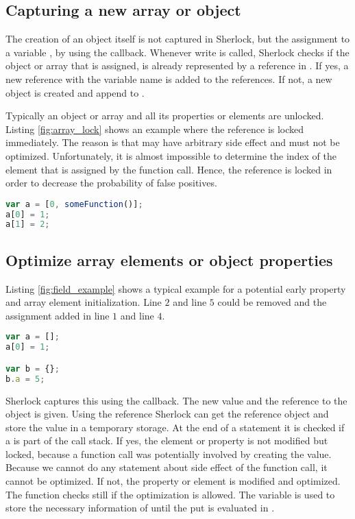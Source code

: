 \subsection{Capturing a new array or object}
The creation of an object itself is not captured in Sherlock, but the assignment to a variable
, by using the  callback. Whenever write is called, Sherlock checks if the object 
or array that is assigned, is already represented by a reference in . If yes, a 
new reference with the variable name is added to the references. If not, a new  
object is created and append to .

Typically an object or array and all its properties or elements are unlocked. Listing 
\ref{fig:array_lock} shows an example where the reference is locked immediately. The reason 
is that  may have arbitrary side effect and must not be optimized. 
Unfortunately, it is almost impossible to determine the index of the element that is assigned
 by the function call. Hence, the reference is locked in order to decrease the probability of
 false positives.

\begin{lstlisting}[caption={Example for an array that is immediately locked after creation. Neither index \js{0} nor index \js{1} is optimized.},language=Javascript,label=fig:array_lock]
var a = [0, someFunction()];
a[0] = 1;
a[1] = 2;
\end{lstlisting}

\subsection{Optimize array elements or object properties}
Listing \ref{fig:field_example} shows a typical example for a potential early property and array 
element initialization. Line $2$ and line $5$ could be removed and the assignment added in line $1$ and line $4$.

\begin{lstlisting}[caption={Example for a typical potential early property and array element initialization},label={fig:field_example},language=Javascript]
var a = [];
a[0] = 1;

var b = {};
b.a = 5;
\end{lstlisting}

Sherlock captures this using the  callback. The new value and the reference 
to the object is given. Using the reference Sherlock can get the reference object and store
 the value in a temporary storage. At the end of a statement it is checked if a 
 is part of the call stack. If yes, the element or property is not modified but locked, 
 because a function call was potentially involved by creating the value. Because we cannot
 do any statement about side effect of the function call, it cannot be optimized. If not, 
 the property or element is modified and optimized. The  function checks still 
 if the optimization is allowed. The variable  is used to store the necessary 
 information of  until the put is evaluated in .


